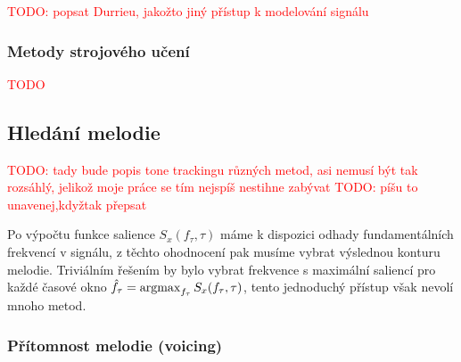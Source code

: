 \textcolor{red}{TODO: popsat Durrieu, jakožto jiný přístup k modelování signálu}

\subsubsection{Metody strojového učení}

\textcolor{red}{TODO}



\subsection{Hledání melodie}

\textcolor{red}{TODO: tady bude popis tone trackingu různých metod, asi nemusí být tak rozsáhlý, jelikož moje práce se tím nejspíš nestihne zabývat}
\textcolor{red}{TODO: píšu to unavenej,kdyžtak přepsat}

Po výpočtu funkce salience $S_x(f_\tau, \tau)$ máme k dispozici odhady fundamentálních frekvencí v signálu, z těchto ohodnocení pak musíme vybrat výslednou konturu melodie. Triviálním řešením by bylo vybrat frekvence s maximální saliencí pro každé časové okno $\hat{f}_\tau = \argmax_{f_\tau}{S_x(f_\tau, \tau)}$, tento jednoduchý přístup však nevolí mnoho metod. 



\subsubsection{Přítomnost melodie (voicing)}

